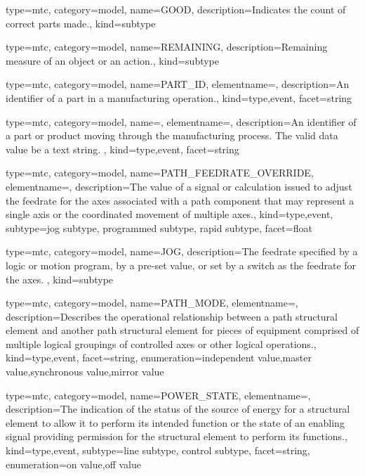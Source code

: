 {
  type=mtc,
  category=model,
  name={GOOD},
  description={Indicates the count of correct parts made.},
  kind={subtype}
}


{
  type=mtc,
  category=model,
  name={REMAINING},
  description={Remaining measure of an object or an action.},
  kind={subtype}
}


{
  type=mtc,
  category=model,
  name={PART\_ID},
  elementname=,
  description={An identifier of a part in a manufacturing operation.},
  kind={type,event},
  facet={\gls{string}}
}


{
  type=mtc,
  category=model,
  name=,
  elementname=,
  description={An identifier of a part or product moving through the manufacturing process. \newline The \gls{valid data value} \must be a text string. },
  kind={type,event},
  facet={\gls{string}}
}


{
  type=mtc,
  category=model,
  name={PATH\_FEEDRATE\_OVERRIDE},
  elementname=,
  description={The value of a signal or calculation issued to adjust the feedrate for the axes associated with a \gls{path} component that may represent a single axis or the coordinated movement of multiple axes.},
  kind={type,event},
  subtype={\gls{jog subtype}, \gls{programmed subtype}, \gls{rapid subtype}},
  facet={\gls{float}}
}


{
  type=mtc,
  category=model,
  name={JOG},
  description={The feedrate specified by a logic or motion program, by a pre-set value, or set by a switch as the feedrate for the \gls{axes}. },
  kind={subtype}
}


{
  type=mtc,
  category=model,
  name={PATH\_MODE},
  elementname=,
  description={Describes the operational relationship between a \gls{path} \gls{structural element} and another \gls{path} \gls{structural element} for pieces of equipment comprised of multiple logical groupings of controlled axes or other logical operations.},
  kind={type,event},
  facet={\gls{string}},
  enumeration={\gls{independent value},\gls{master value},\gls{synchronous value},\gls{mirror value}}
}


{
  type=mtc,
  category=model,
  name={POWER\_STATE},
  elementname=,
  description={The indication of the status of the source of energy for a \gls{structural element} to allow it to perform its intended function or the state of an enabling signal providing permission for the \gls{structural element} to perform its functions.},
  kind={type,event},
  subtype={\gls{line subtype}, \gls{control subtype}},
  facet={\gls{string}},
  enumeration={\gls{on value},\gls{off value}}
}


